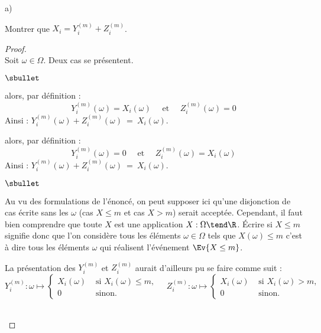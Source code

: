 \documentclass[11pt]{article}%
\begin{document}
\begin{liste}{a)}
  \setlength{\itemsep}{2mm}
\item Montrer que $X_{i} = Y_{i}^{(m)} + Z_{i}^{(m)}$.
  
  \begin{proof}~\\%
    Soit $\omega \in \Omega$. Deux cas se présentent.
    \begin{noliste}{$\sbullet$}
    \item {} alors, par définition :
      \[
      Y_{i}^{(m)}(\omega) = X_i(\omega) \quad \text{ et } \quad
      Z_{i}^{(m)}(\omega) = 0
      \]
      Ainsi : $Y_{i}^{(m)}(\omega) + Z_{i}^{(m)}(\omega) \ = \
      X_i(\omega)$.


      \newpage


    \item {} alors, par définition :
      \[
      Y_{i}^{(m)}(\omega) = 0 \quad \text{ et } \quad Z_{i}^{(m)}(\omega) =
      X_i(\omega)
      \]
      Ainsi : $Y_{i}^{(m)}(\omega) + Z_{i}^{(m)}(\omega) \ = \
      X_i(\omega)$.
    \end{noliste}
    \begin{remark}%
      \begin{noliste}{$\sbullet$}
      \item Au vu des formulations de l'énoncé, on peut supposer ici
        qu'une disjonction de cas écrite sans les $\omega$ (cas $X
        \leq m$ et cas $X > m$) serait acceptée. Cependant, il faut
        bien comprendre que toute \var $X$ est une application $X :
        \Omega \tend \R$. Écrire \og si $X \leq m$ \fg{} signifie donc
        que l'on considère tous les éléments $\omega \in \Omega$ tels
        que $X(\omega) \leq m$ c'est à dire tous les éléments $\omega$
        qui réalisent l'événement $\Ev{X \leq m}$.
      \item La présentation des \var $Y_{i}^{(m)}$ et $Z_{i}^{(m)}$
        aurait d'ailleurs pu se faire comme suit :
        \[
        Y_{i}^{(m)} : \omega \mapsto \left\{
          \begin{array}{cl}
            X_{i}(\omega) & \text{ si } X_{i}(\omega) \leq m, \\
            0 & \text{ sinon}.
          \end{array}
        \right. %
        \quad %
        Z_{i}^{(m)} : \omega \mapsto %
        \left\{
          \begin{array}{cl}
            X_{i}(\omega) & \text{ si } X_{i}(\omega) > m, \\
            0 & \text{ sinon}.
          \end{array}
        \right.
        \]
      \end{noliste}
    \end{remark}~\\[-1.4cm]
  \end{proof}

\item ~\\[-1.15cm]
\end{liste}
\end{document}
